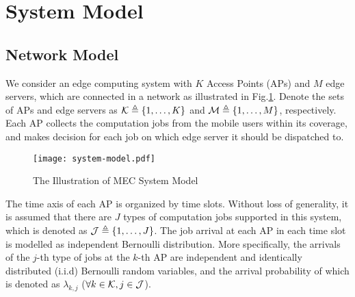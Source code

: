 \section{System Model}
\subsection{Network Model}
We consider an edge computing system with $K$ Access Points (APs) and $M$ edge servers, which are connected in a network as illustrated in Fig.\ref{fig:system}.
Denote the sets of APs and edge servers as $\mathcal{K} \triangleq \{1,\dots,K\}$ and $\mathcal{M} \triangleq \{1,\dots,M\}$, respectively.
Each AP collects the computation jobs from the mobile users within its coverage, and makes decision for each job on which edge server it should be dispatched to.

\begin{figure}[ht]
    \centering
    \texttt{[image: system-model.pdf]}
    \caption{The Illustration of MEC System Model}
    \label{fig:system}
\end{figure}

The time axis of each AP is organized by time slots.
Without loss of generality, it is assumed that there are $J$ types of computation jobs supported in this system, which is denoted as $\mathcal{J} \triangleq \{1,\dots,J\}$.
The job arrival at each AP in each time slot is modelled as independent Bernoulli distribution.
More specifically, the arrivals of the $j$-th type of jobs at the $k$-th AP are independent and identically distributed (i.i.d) Bernoulli random variables, and the arrival probability of which is denoted as $\lambda_{k,j}$ ($\forall k\in\mathcal{K}, j\in\mathcal{J}$).


